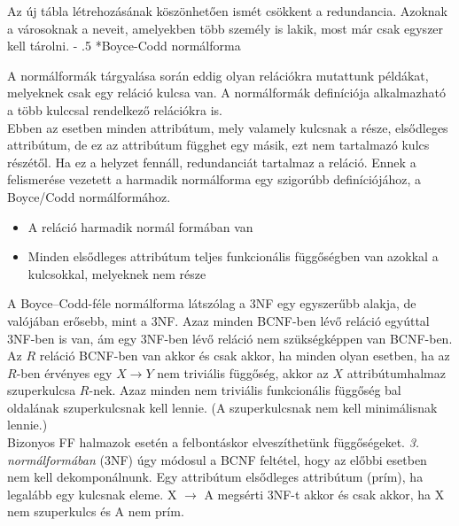 \documentclass[tikz,12pt,margin=0px]{article}
\makeatletter
\renewcommand\paragraph{%
	\@startsection{paragraph}{4}{0mm}%
	{-\baselineskip}%
	{.5\baselineskip}%
	{\normalfont\normalsize\bfseries}}
\makeatother
\begin{document}
{    \noindent Az új tábla létrehozásának köszönhetően ismét csökkent a redundancia. Azoknak a városoknak a neveit, amelyekben több személy is lakik, most már csak egyszer kell tárolni.
\newpage
    \paragraph*{Boyce-Codd normálforma}

    \noindent A normálformák tárgyalása során eddig olyan relációkra mutattunk példákat, melyeknek csak egy reláció kulcsa van. A normálformák definíciója alkalmazható a több kulccsal rendelkező relációkra is.\\

    \noindent Ebben az esetben minden attribútum, mely valamely kulcsnak a része, elsődleges attribútum, de ez az attribútum függhet egy másik, ezt nem tartalmazó kulcs részétől. Ha ez a helyzet fennáll, redundanciát tartalmaz a reláció. Ennek a felismerése vezetett a harmadik normálforma egy szigorúbb definíciójához, a Boyce/Codd normálformához.

    \begin{itemize}
        \item A reláció harmadik normál formában van
        \item Minden elsődleges attribútum teljes funkcionális függőségben van azokkal a kulcsokkal, melyeknek nem része
    \end{itemize}

    \noindent A Boyce–Codd-féle normálforma látszólag a 3NF egy egyszerűbb alakja, de valójában erősebb, mint a 3NF. Azaz minden BCNF-ben lévő reláció egyúttal 3NF-ben is van, ám egy 3NF-ben lévő reláció nem szükségképpen van BCNF-ben.\\

    \noindent Az $R$ reláció BCNF-ben van akkor és csak akkor, ha minden olyan esetben, ha az $R$-ben érvényes egy $X \rightarrow Y$ nem triviális függőség, akkor az $X$ attribútumhalmaz szuperkulcsa $R$-nek. Azaz minden nem triviális funkcionális függőség bal oldalának szuperkulcsnak kell lennie. (A szuperkulcsnak nem kell minimálisnak lennie.)\\

    \noindent Bizonyos FF halmazok esetén a felbontáskor elveszíthetünk függőségeket. \textit{3. normálformában} (3NF) úgy módosul a BCNF feltétel, hogy az előbbi esetben nem kell dekomponálnunk. Egy attribútum elsődleges attribútum (prím), ha legalább egy kulcsnak eleme. X $\to$ A megsérti 3NF-t akkor és csak akkor, ha X nem szuperkulcs és A nem prím.

}
\end{document}
